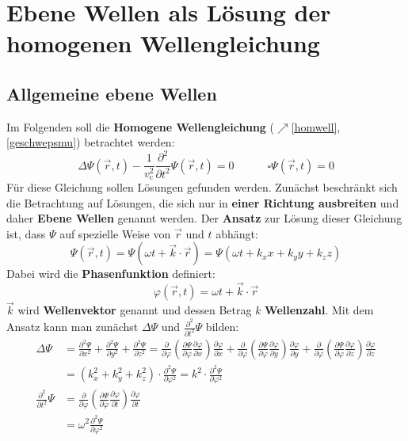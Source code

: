   \section{Ebene Wellen als Lösung der homogenen Wellengleichung}\label{ebwell}
  \subsection{Allgemeine ebene Wellen}
	   Im Folgenden soll die \textbf{Homogene Wellengleichung} ($\nearrow$\ref{homwell},\ref{geschwepsmu}) betrachtet werden:
		        \begin{equation}\label{homwell1}
			        \Delta \Psi (\vec{r} , t) - \frac{1}{ v_\mathrm{c}^2}\frac{\partial ^2}{\partial t^2}\Psi (\vec{r} , t) = 0 \qquad\quad \square \Psi (\vec{r} , t) = 0
		        \end{equation}
	Für diese Gleichung sollen Lösungen gefunden werden. Zunächst beschränkt sich die Betrachtung auf Lösungen, die sich nur in \textbf{einer Richtung ausbreiten} und daher \textbf{Ebene Wellen} genannt werden. Der \textbf{Ansatz} zur Lösung dieser Gleichung ist, dass $\Psi$ auf spezielle Weise von $\vec{r}$ und $t$ abhängt:
		        \begin{equation}\label{anseben}
			        \boxed{\Psi(\vec{r} , t) = \Psi (\omega t + \vec{k}\cdot\vec{r} )  = \Psi  (\omega t + k_x x+ k_y y + k_z z )}
		        \end{equation}
	Dabei wird  die \textbf{Phasenfunktion} definiert:
	\begin{equation}
		\varphi (\vec{r} , t) = \omega t + \vec{k}\cdot\vec{r}
	\end{equation}
		$\vec{k}$ wird \textbf{Wellenvektor} genannt und dessen Betrag $k$ \textbf{Wellenzahl}. Mit dem Ansatz kann man zunächst $\Delta \Psi$ und $ \frac{\partial^2}{\partial t^2}\Psi$ bilden:
		        \begin{equation*}\begin{split}
				         \Delta \Psi&= \frac{\partial^2 \Psi}{\partial x^2} + \frac{\partial^2 \Psi}{\partial y^2} + \frac{\partial^2 \Psi}{\partial z^2}=\frac{\partial}{\partial \varphi}\left(\frac{\partial \Psi}{\partial\varphi}\frac{\partial \varphi}{\partial x}\right)\frac{\partial \varphi}{\partial x} + \frac{\partial}{\partial \varphi}\left(\frac{\partial \Psi}{\partial\varphi}\frac{\partial \varphi}{\partial y}\right)\frac{\partial \varphi}{\partial y} + \frac{\partial}{\partial \varphi}\left(\frac{\partial \Psi}{\partial\varphi}\frac{\partial \varphi}{\partial z}\right)\frac{\partial \varphi}{\partial z} \\
				         &=  (k_x^2+k_y^2+k_z^2)\cdot\frac{\partial^2 \Psi}{\partial \varphi^2} =k^2\cdot\frac{\partial^2 \Psi}{\partial \varphi^2}  \\
				            \frac{\partial^2}{\partial t^2}\Psi &= \frac{\partial}{\partial \varphi}\left(\frac{\partial \Psi}{\partial\varphi}\frac{\partial \varphi}{\partial t}\right)\frac{\partial \varphi}{\partial t}\\
				            &=\omega^2\frac{\partial^2 \Psi}{\partial \varphi^2}\\
		\end{split}\end{equation*}
